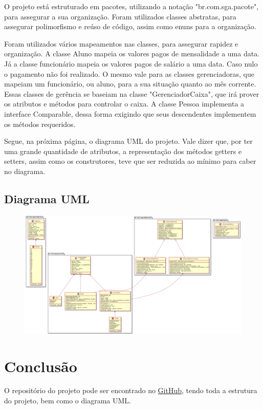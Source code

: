 \documentclass[12pt]{article}
\begin{document}
O projeto está estruturado em pacotes, utilizando a notação "br.com.sga.pacote", para assegurar a sua organização. Foram utilizados classes abstratas, para assegurar polimorfismo e reúso de código, assim como enuns para a organização.

Foram utilizados vários mapeamentos nas classes, para assegurar rapidez e organização. A classe Aluno mapeia os valores pagos de mensalidade a uma data. Já a classe funcionário mapeia os valores pagos de salário a uma data. Caso nulo o pagamento não foi realizado. O mesmo vale para as classes gerenciadoras, que mapeiam um funcionário, ou aluno, para a sua situação quanto ao mês corrente. Essas classes de gerência se baseiam na classe "GerenciadorCaixa", que irá prover os atributos e métodos para controlar o caixa. A classe Pessoa implementa a interface Comparable, dessa forma exigindo que seus descendentes implementem os métodos requeridos. 

Segue, na próxima página, o diagrama UML do projeto. Vale dizer que, por ter uma grande quantidade de atributos, a representação dos métodos getters e setters, assim como os construtores, teve que ser reduzida ao mínimo para caber no diagrama.

\newpage
\begin{landscape}

\subsection{Diagrama UML}
\begin{figure}[!h]
\centering
\includegraphics[width=25cm]{sga.png}
\end{figure}
\end{landscape}

\section{Conclusão}

O repositório do projeto pode ser encontrado no
\href{https://github.com/pedrobotelho15/SGA}{GitHub}, tendo toda a estrutura do projeto, bem como o diagrama UML.
\end{document}
